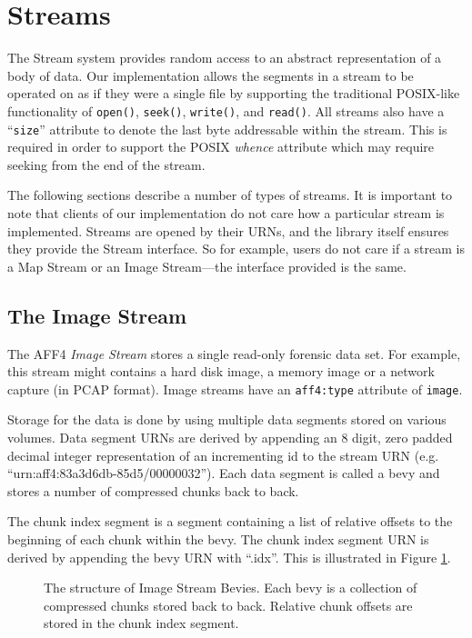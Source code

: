 \documentclass[10pt, conference]{IEEEtran}
\begin{document}
\section{Streams}
The Stream system provides random access to an abstract representation
of a body of data. Our implementation allows the segments in a stream
to be operated on as if they were a single file by supporting the
traditional POSIX-like functionality of
\texttt{open()}, \texttt{seek()}, \texttt{write()}, and
\texttt{read()}. All streams also have a ``\texttt{size}'' attribute
to denote the last byte addressable within the stream. This is
required in order to support the POSIX \emph{whence} attribute which
may require seeking from the end of the stream.

The following sections describe a number of types of streams. It is
important to note that clients of our implementation do not care how a
particular stream is implemented. Streams are opened by their URNs,
and the library itself ensures they provide the Stream interface. So
for example, users do not care if a stream is a Map Stream or an Image
Stream---the interface provided is the same.

\subsection{The Image Stream}
\label{image_stream}
The AFF4 \emph{Image Stream} stores a single read-only forensic data
set. For example, this stream might contains a hard disk image, a
memory image or a network capture (in PCAP format). Image streams have
an \texttt{aff4:type} attribute of \texttt{image}.

Storage for the data is done by using multiple data segments stored on
various volumes. Data segment URNs are derived by appending an 8
digit, zero padded decimal integer representation of an incrementing
id to the stream URN (e.g. ``urn:aff4:83a3d6db-85d5/00000032''). Each
data segment is called a bevy and stores a number of compressed chunks
back to back. 

The chunk index segment is a segment containing a list of relative
offsets to the beginning of each chunk within the bevy. The chunk
index segment URN is derived by appending the bevy URN with
``.idx''. This is illustrated in Figure \ref{image_stream_bevy}.

\begin{figure}[tb]
  \begin{center}
  \mbox{\columnwidth {}}
  \caption{The structure of Image Stream Bevies. Each bevy is a
collection of compressed chunks stored back to back. Relative chunk
offsets are stored in the chunk index segment.}
  \label{image_stream_bevy}
  \end{center}
\end{figure}
\end{document}
